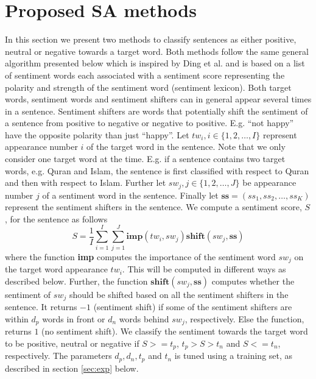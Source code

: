 \documentclass[11pt]{article}
\begin{document}
\section{Proposed SA methods}
\label{sec:om}

In this section we present two methods to classify sentences as either positive, neutral or negative towards a target word. Both methods follow the same general algorithm presented below which is inspired by Ding et al.  and is based on a list of sentiment words each associated with a sentiment score representing the polarity and strength of the sentiment word (sentiment lexicon). Both target words, sentiment words and sentiment shifters can in general appear several times in a sentence. Sentiment shifters are words that potentially shift the sentiment of a sentence from positive to negative or negative to positive. E.g. ``not happy'' have the opposite polarity than just ``happy''. Let $tw_i, i \in \{1,2,\ldots,I\}$ represent appearance number $i$ of the target word in the sentence. Note that we only consider one target word at the time. E.g. if a sentence contains two target words, e.g. Quran and Islam, the sentence is first classified with respect to Quran and then with respect to Islam. Further let $sw_{j}, j \in \{1,2,\ldots,J\}$ be appearance number $j$ of a sentiment word in the sentence. Finally let $\textbf{ss} = (ss_1, ss_2, \ldots, ss_K)$ represent the sentiment shifters in the sentence. We compute a sentiment score, $S$, for the sentence as follows
\begin{equation}
  \label{eq:1}
  S = \frac{1}{I}\sum_{i=1}^{I} \sum_{j=1}^{J} \mathbf{imp}(tw_i, sw_{j})\mathbf{shift}(sw_{j}, \mathbf{ss})    
\end{equation}
where the function \textbf{imp} computes the importance of the sentiment word $sw_{j}$ on the target word appearance $tw_i$. This will be computed in different ways as described below. Further, the function $\mathbf{shift}(sw_{j}, \mathbf{ss})$ computes whether the sentiment of $sw_{j}$ should be shifted based on all the sentiment shifters in the sentence. It returns $-1$ (sentiment shift) if some of the sentiment shifters are within $d_{p}$ words in front or $d_{n}$ words behind $sw_{j}$, respectively. Else the function, returns $1$ (no sentiment shift). We classify the sentiment towards the target word to be positive, neutral or negative if $S >= t_p$,  $t_p > S > t_n$ and  $S <= t_n$, respectively. The parameters $d_p, d_n, t_p$ and $t_n$ is tuned using a training set, as described in section \ref{sec:exp} below.
\end{document}
